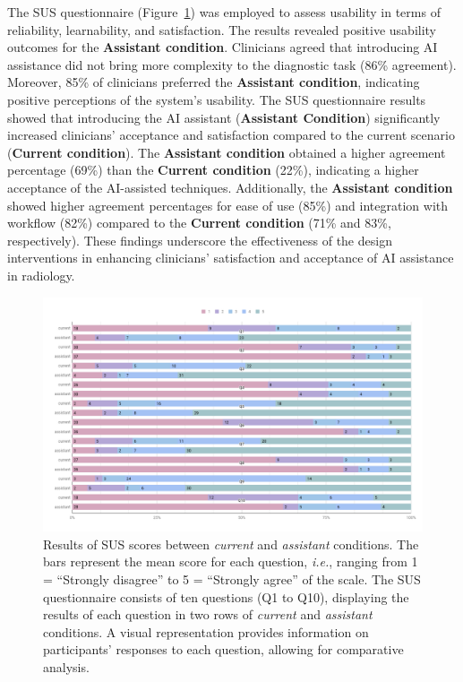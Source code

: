 The \ac{SUS} questionnaire (Figure~\ref{fig:fig109}) was employed to assess usability in terms of reliability, learnability, and satisfaction.
The results revealed positive usability outcomes for the {\bf Assistant condition}.
Clinicians agreed that introducing AI assistance did not bring more complexity to the diagnostic task (86\% agreement).
Moreover, 85\% of clinicians preferred the {\bf Assistant condition}, indicating positive perceptions of the system's usability.
The \ac{SUS} questionnaire results showed that introducing the \ac{AI} assistant ({\bf Assistant Condition}) significantly increased clinicians' acceptance and satisfaction compared to the current scenario ({\bf Current condition}).
The {\bf Assistant condition} obtained a higher agreement percentage (69\%) than the {\bf Current condition} (22\%), indicating a higher acceptance of the AI-assisted techniques.
Additionally, the {\bf Assistant condition} showed higher agreement percentages for ease of use (85\%) and integration with workflow (82\%) compared to the {\bf Current condition} (71\% and 83\%, respectively).
These findings underscore the effectiveness of the design interventions in enhancing clinicians' satisfaction and acceptance of AI assistance in radiology.

\begin{figure}[ht]
\centering
\includegraphics[width=\columnwidth]{images/fig109}
\caption{Results of SUS scores between {\it current} and {\it assistant} conditions. The bars represent the mean score for each question, {\it i.e.}, ranging from 1 = ``Strongly disagree'' to 5 = ``Strongly agree'' of the scale. The SUS questionnaire consists of ten questions (Q1 to Q10), displaying the results of each question in two rows of {\it current} and {\it assistant} conditions. A visual representation provides information on participants' responses to each question, allowing for comparative analysis.}
\label{fig:fig109}
\end{figure}

